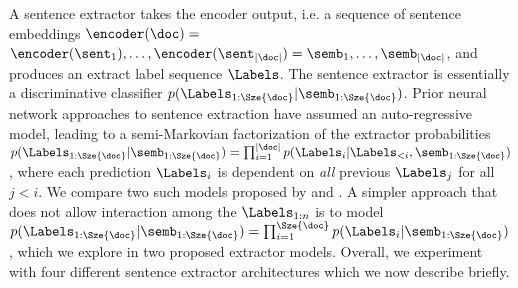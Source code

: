 A sentence extractor takes the encoder output, i.e. 
a sequence of sentence embeddings
$\encoder(\doc) =$ $\encoder(\sent_1), \ldots, \encoder(\sent_{|\doc|}) =
\semb_1, \ldots, \semb_{|\doc|}$, and produces an extract label sequence
$\Labels$. 
The sentence extractor is essentially a discriminative
classifier $p(\Labels_{1:\Sze{\doc}} | \semb_{1:\Sze{\doc}})$.
Prior neural network approaches 
\cite{nallapati2016summarunner,cheng2016neural} 
to sentence extraction have assumed
an auto-regressive model, leading to a semi-Markovian
factorization of the extractor probabilities
$p(\Labels_{1:\Sze{\doc}} | \semb_{1:\Sze{\doc}})=\prod_{i=1}^{|\doc|} 
p(\Labels_i|\Labels_{<i},\semb_{1:\Sze{\doc}})$,
where each prediction $\Labels_i$ is dependent on \emph{all}
previous $\Labels_j$ for
all $j < i$. We compare two such models proposed by \cite{cheng2016neural}
and \cite{nallapati2016summarunner}.
A simpler approach that does not allow interaction among the $\Labels_{1:n}$
is to
model $p(\Labels_{1:\Sze{\doc}}|\semb_{1:\Sze{\doc}}) = 
\prod_{i=1}^{\Sze{\doc}} p(\Labels_i|\semb_{1:\Sze{\doc}})$,
which we explore in two proposed extractor models.
Overall, we experiment with four different sentence extractor architectures
which we now describe briefly.

